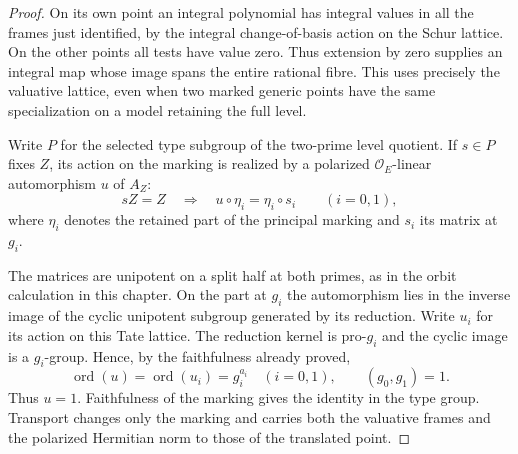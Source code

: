 \begin{proof}
On its own point an integral polynomial
has integral values in all the frames just identified, by the integral
change-of-basis action on the Schur lattice. On the other points all
tests have value zero. Thus extension by zero supplies an integral map
whose image spans the entire rational fibre. This uses precisely the
valuative lattice, even when two marked generic points have the same
specialization on a model retaining the full level.

Write \(P\) for the selected type subgroup of the two-prime level
quotient. If \(s\in P\) fixes \(Z\), its action on the marking is realized
by a polarized \(\mathcal O_E\)-linear automorphism \(u\) of \(A_Z\):
\[
    sZ=Z\quad\Longrightarrow\quad
       u\circ\eta_i=\eta_i\circ s_i \qquad(i=0,1),
\]
where \(\eta_i\) denotes the retained part of the principal marking
and \(s_i\) its matrix at \(g_i\). 

The matrices are unipotent on a split half at both primes, as in the orbit
calculation in this chapter. On the part at \(g_i\) the automorphism lies in the inverse image of the cyclic unipotent subgroup generated
by its reduction. Write \(u_i\) for its action on this Tate lattice. The reduction kernel
is pro-\(g_i\) and the cyclic image is a \(g_i\)-group. Hence, by the
faithfulness already proved,
\[
    \operatorname{ord}(u)=\operatorname{ord}(u_i)=g_i^{a_i}
       \quad(i=0,1),\qquad (g_0,g_1)=1 .
\]
Thus \(u=1\). Faithfulness of the marking gives the identity in the type group. Transport
changes only the marking and carries both the valuative frames and the
polarized Hermitian norm to those of the translated point.
\end{proof}

